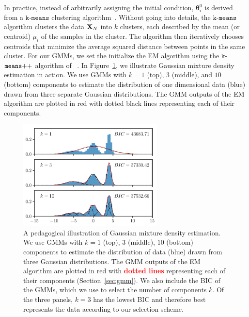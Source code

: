\documentclass[12pt, letterpaper, preprint]{aastex}
\newcommand{\todo}[1]{{\bf \textcolor{red}{#1}}}
\begin{document}
In practice, instead of arbitrarily assigning the initial condition, 
$\bm{\theta}^0_i$ is derived from a $\mathtt{k}$-$\mathtt{means}$ 
clustering algorithm~\citep{lloyd1982}. Without going into details, the 
$\mathtt{k}$-$\mathtt{means}$ algorithm clusters the data ${\bf X}_N$ into $k$ 
clusters, each described by the mean (or centroid) $\mu_i$ of the
samples in the cluster. The algorithm then iteratively chooses centroids that 
minimize the average squared distance between points in the same cluster.
For our GMMs, we set the initialize the EM algorithm using 
the $\mathtt{k}$-$\mathtt{means}{\tiny ++}$ algorithm of ~\cite{arthur2007}. 
In Figure~\ref{fig:gmm_ped}, we illustrate Gaussian mixture 
density estimation in action. We use GMMs with $k = 1$ (top), $
3$ (middle), and $10$ (bottom) components to estimate the
distribution of one dimensional data (blue) drawn from three 
separate Gaussian distributions. The GMM outputs of the EM algorithm 
are plotted in red with dotted black lines representing each of their 
components.  

\begin{figure}
\begin{center}
\includegraphics[width=0.65\textwidth]{figs/GMM_pedagog.pdf}
\caption{A pedagogical illustration of Gaussian mixture density estimation.
    We use GMMs with $k = 1$ (top), $3$ (middle), $10$ (bottom) 
    components to estimate the distribution of data (blue) drawn from three 
    Gaussian distributions. The GMM outputs of the EM algorithm 
    are plotted in red with \todo{dotted lines} representing each of their 
    components (Section~\ref{sec:gmm}). We also include the BIC of 
    the GMMs, which we use to select the number of components $k$. 
    Of the three panels, $k=3$ has the lowest BIC and therefore 
    best represents the data according to our selection scheme.} 
\label{fig:gmm_ped}
\end{center}
\end{figure}
\end{document}
